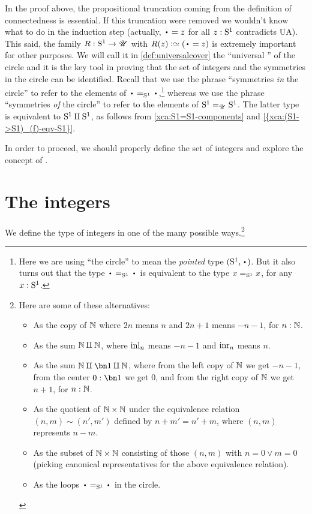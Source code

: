In the proof above, the propositional truncation coming
from the definition of connectedness is essential.
If this truncation were removed we wouldn't know what to do in
the induction step (actually, ${\base=z}$ for all $z:{\mathrm{S}^1}$ contradicts UA).
This said, the family $R:{\mathrm{S}^1}\to{\mathscr{U}}$ with $R(z)\defequi (\base=z)$ is extremely
important for other purposes. We will call it in \cref{def:universalcover} the
``universal \covering'' of the circle and it is the key tool in proving that
the set of integers and the symmetries in the circle can be identified.
Recall that we
use the phrase ``symmetries \emph{in} the circle'' to refer to the
elements of $\base=_{\Sc}\base$,\footnote{%
  Here we are using ``the circle'' to mean the
  \emph{pointed} type $(\Sc,\base)$.
  But it also turns out that the type $\base=_{\Sc}\base$ is
  equivalent to the type $x=_{{\mathrm{S}^1}}x$, for any $x:{\mathrm{S}^1}$.}
whereas we use the phrase ``symmetries \emph{of} the circle'' to refer to the elements of ${\mathrm{S}^1}=_{{\mathscr{U}}}{\mathrm{S}^1}$.
The latter type is equivalent to ${\mathrm{S}^1}\amalg{\mathrm{S}^1}$,
as follows from \cref{xca:S1=S1-components} and \cref{{xca:(S1->S1)_(f)-eqv-S1}}.

In order to proceed, we should properly define the set of integers
and explore the concept of \coverings.

\section{The integers}
\label{sec:integers}

We define the type of integers in one of the many possible ways.\footnote{%
  Here are some of these alternatives:
  \begin{itemize}
  \item As the copy of $\mathbb{N}$ where $2n$ means $n$ and $2n+1$ means $-n-1$, for $n:\mathbb{N}$.
  \item As the sum $\mathbb{N}\amalg\mathbb{N}$, where $\inl{n}$ means $-n-1$ and $\inr{n}$ means $n$.
  \item As the sum $\NN\coprod\bn1\coprod\NN$, where from the left copy of $\mathbb{N}$ we get $-n-1$, from the center $0:\bn1$ we get $0$, and from the right copy of $\mathbb{N}$ we get $n+1$, for $n:\mathbb{N}$.
  \item As the quotient of $\mathbb{N}\times\mathbb{N}$ under the equivalence relation
    $(n,m) \sim (n',m')$ defined by $n+m' = n'+m$,
    where $(n,m)$ represents $n-m$.
  \item As the subset of $\mathbb{N}\times\mathbb{N}$ consisting of those $(n,m)$ with $n=0\lor m=0$ (picking canonical representatives for the above equivalence relation).
  \item As the loops $\base=_\Sc\base$ in the circle. %
  \end{itemize}}

